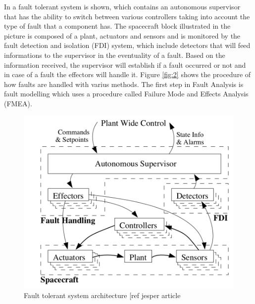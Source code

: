 In  a fault tolerant system is shown, which contains an autonomous supervisor that has the ability to switch between various controllers taking into account the type of fault that a component has. The spacecraft block illustrated in the picture is composed of a plant, actuators and sensors and is monitored by the fault detection and isolation (FDI) system, which include detectors that will feed informations to the supervisor in the eventuality of a fault. Based on the information received, the supervisor will establish if a fault occurred or not and in case of a fault the effectors will handle it. Figure \ref{fig:2} shows the procedure of how faults are handled with varius methods. The first step in Fault Analysis is fault modelling which uses a procedure called Failure Mode and Effects Analysis (FMEA).
\begin{table}[H]
	\begin{minipage}[b]{0.49\linewidth}
		\centering
		\begin{figure}[H]
			\centering
			\includegraphics[width=1\linewidth]{figures/FTC}
			\caption{Fault tolerant system architecture [ref jesper article}
			\label{fig:1}
		\end{figure}
	\end{minipage}\hfill
	\begin{minipage}[b]{0.49\linewidth}
		\centering
		\begin{figure}[H]
			\centering

\end{figure}
\end{minipage}
\end{table}
